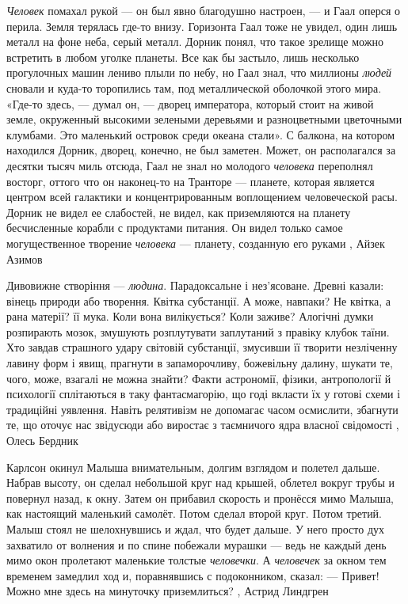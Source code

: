 \emph{Человек} помахал рукой — он был явно благодушно настроен, — и Гаал оперся о
перила. Земля терялась где-то внизу. Горизонта Гаал тоже не увидел, один лишь
металл на фоне неба, серый металл. Дорник понял, что такое зрелище можно
встретить в любом уголке планеты. Все как бы застыло, лишь несколько
прогулочных машин лениво плыли по небу, но Гаал знал, что миллионы \emph{людей}
сновали и куда-то торопились там, под металлической оболочкой этого мира.
«Где-то здесь, — думал он, — дворец императора, который стоит на живой земле,
окруженный высокими зелеными деревьями и разноцветными цветочными клумбами. Это
маленький островок среди океана стали». С балкона, на котором находился Дорник,
дворец, конечно, не был заметен. Может, он располагался за десятки тысяч миль
отсюда, Гаал не знал но молодого \emph{человека} переполнял восторг, оттого что он
наконец-то на Транторе — планете, которая является центром всей галактики и
концентрированным воплощением человеческой расы. Дорник не видел ее слабостей,
не видел, как приземляются на планету бесчисленные корабли с продуктами
питания. Он видел только самое могущественное творение \emph{человека} — планету,
созданную его руками
, Айзек Азимов

Дивовижне створіння — \emph{людина}. Парадоксальне і нез’ясоване. Древні
казали: вінець природи або творення. Квітка субстанції. А може, навпаки? Не
квітка, а рана матерії? її мука. Коли вона вилікується? Коли заживе?  Алогічні
думки розпирають мозок, змушують розплутувати заплутаний з правіку клубок
таїни. Хто завдав страшного удару світовій субстанції, змусивши її творити
незліченну лавину форм і явищ, прагнути в запаморочливу, божевільну далину,
шукати те, чого, може, взагалі не можна знайти? Факти астрономії, фізики,
антропології й психології сплітаються в таку фантасмагорію, що годі вкласти їх
у готові схеми і традиційні уявлення. Навіть релятивізм не допомагає часом
осмислити, збагнути те, що оточує нас звідусюди або виростає з таємничого ядра
власної свідомості
, Олесь Бердник

Карлсон окинул Малыша внимательным, долгим взглядом и полетел дальше. Набрав
высоту, он сделал небольшой круг над крышей, облетел вокруг трубы и повернул
назад, к окну. Затем он прибавил скорость и пронёсся мимо Малыша, как настоящий
маленький самолёт. Потом сделал второй круг. Потом третий.  Малыш стоял не
шелохнувшись и ждал, что будет дальше. У него просто дух захватило от волнения
и по спине побежали мурашки — ведь не каждый день мимо окон пролетают маленькие
толстые \emph{человечки}.  А \emph{человечек} за окном тем временем замедлил
ход и, поравнявшись с подоконником, сказал: — Привет! Можно мне здесь на
минуточку приземлиться?
, Астрид Линдгрен

